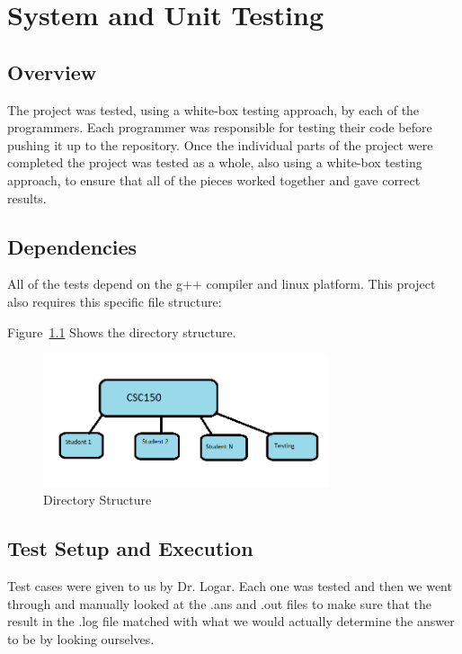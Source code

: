 
\chapter{System  and Unit Testing}


\section{Overview}
The project was tested, using a white-box testing approach, by each of the programmers. Each programmer was responsible for testing their code before pushing it up to the repository. Once the individual parts of the project were completed the project was tested as a whole, also using a white-box testing approach, to ensure that all of the pieces worked together and gave correct results.


\section{Dependencies}
All of the tests depend on the g++ compiler and linux platform. This project also requires this specific file structure:

Figure~\ref{directory_structure} Shows the directory structure.

\begin{figure}[H]
\begin{center}
\includegraphics[width=0.75\textwidth]{./directory_structure}
\end{center}
\caption{Directory Structure \label{directory_structure}}
\end{figure}


\section{Test Setup and Execution}
Test cases were given to us by Dr. Logar.  Each one was tested and then we went through 
and manually looked at the .ans and .out files to make sure that the result in the .log file
matched with what we would actually determine the answer to be by looking ourselves.



